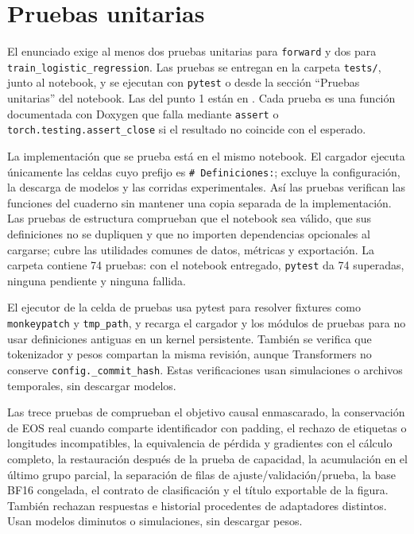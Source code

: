 \section{Pruebas unitarias}
\label{sec:pruebas}

El enunciado exige al menos dos pruebas unitarias para \texttt{forward} y
dos para \texttt{train\_logistic\_regression}. Las pruebas se entregan en
la carpeta \texttt{tests/}, junto al notebook, y se ejecutan con
\texttt{pytest} o desde la sección ``Pruebas unitarias'' del notebook. Las
del punto 1 están en . Cada prueba es una función
documentada con Doxygen que falla mediante \texttt{assert} o
\texttt{torch.testing.assert\_close} si el resultado no coincide con el
esperado.

La implementación que se prueba está en el mismo notebook. El cargador
 ejecuta únicamente las celdas cuyo prefijo
es \texttt{\# Definiciones:}; excluye la configuración, la descarga de
modelos y las corridas experimentales. Así las pruebas verifican las
funciones del cuaderno sin mantener una copia separada de la
implementación. Las pruebas de estructura comprueban que el notebook sea
válido, que sus definiciones no se dupliquen y que no importen dependencias
opcionales al cargarse;  cubre las utilidades
comunes de datos, métricas y exportación. La carpeta contiene 74 pruebas:
con el notebook entregado, \texttt{pytest} da 74 superadas, ninguna
pendiente y ninguna fallida.

El ejecutor de la celda de pruebas usa pytest para resolver fixtures como
\texttt{monkeypatch} y \texttt{tmp\_path}, y recarga el cargador y los
módulos de pruebas para no usar definiciones antiguas en un kernel
persistente. También se verifica que tokenizador y pesos compartan la misma
revisión, aunque Transformers no conserve \texttt{config.\_commit\_hash}.
Estas verificaciones usan simulaciones o archivos temporales, sin descargar
modelos.

Las trece pruebas de 
comprueban el objetivo causal enmascarado, la conservación de EOS real
cuando comparte identificador con padding, el rechazo de etiquetas o
longitudes incompatibles, la equivalencia de pérdida y gradientes con
el cálculo completo, la restauración después de la prueba de capacidad,
la acumulación en el último grupo parcial, la separación de filas de
ajuste/validación/prueba, la base BF16 congelada, el contrato de clasificación
y el título exportable de la figura. También rechazan respuestas e
historial procedentes de adaptadores distintos. Usan modelos diminutos o
simulaciones, sin descargar pesos.

